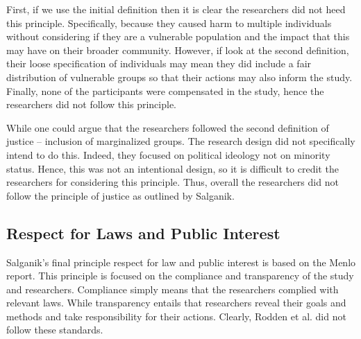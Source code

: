 \documentclass[12pt]{article}
\begin{document}
First, if we use the initial definition then it is clear the researchers did not heed this principle. Specifically, because they caused harm to multiple individuals without considering if they are a vulnerable population and the impact that this may have on their broader community. However, if look at the second definition, their loose specification of individuals may mean they did include a fair distribution of vulnerable groups so that their actions may also inform the study. Finally, none of the participants were compensated in the study, hence the researchers did not follow this principle. 

While one could argue that the researchers followed the second definition of justice – inclusion of marginalized groups. The research design did not specifically intend to do this. Indeed, they focused on political ideology not on minority status. Hence, this was not an intentional design, so it is difficult to credit the researchers for considering this principle. Thus, overall the researchers did not follow the principle of justice as outlined by Salganik. 

\subsection{Respect for Laws and Public Interest}

Salganik’s final principle respect for law and public interest is based on the Menlo report. This principle is focused on the compliance and transparency of the study and researchers. Compliance simply means that the researchers complied with relevant laws. While transparency entails that researchers reveal their goals and methods and take responsibility for their actions. Clearly, Rodden et al. did not follow these standards.
\end{document}
